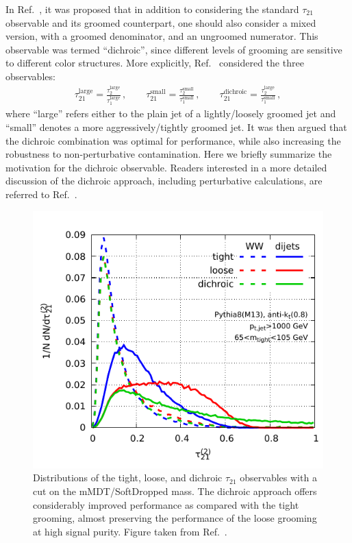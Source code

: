 \documentclass[11pt]{cernrep}
\begin{document}
In Ref.~\cite{Salam:2016yht}, it was proposed that in addition to considering the standard $\tau_{21}$ observable and its groomed counterpart, one should also consider a mixed version, with a groomed denominator, and an ungroomed numerator.
%
This observable was termed ``dichroic'', since different levels of grooming are sensitive to different color structures.
%
More explicitly, Ref.~\cite{Salam:2016yht} considered the three observables:
%
\begin{align}
  \tau_{21}^{\text{large}} =\frac{\tau_2^{\text{large}}}{\tau_1^{\text{large}}}\,,
  \qquad
  \tau_{21}^{\text{small}} =\frac{\tau_2^{\text{small}}}{\tau_1^{\text{small}}}\,,
  \qquad
  \tau_{21}^{\text{dichroic}} =\frac{\tau_2^{\text{large}}}{\tau_1^{\text{small}}}\,,
\end{align}
where ``large'' refers either to the plain jet of a
lightly/loosely groomed jet and ``small'' denotes a more aggressively/tightly
groomed jet.
%
It was then argued that the dichroic combination was optimal for
performance, while also increasing the robustness to non-perturbative
contamination.
%
Here we briefly summarize the motivation for the dichroic observable.
%
Readers interested in a more detailed discussion of the dichroic approach, including perturbative calculations, are referred to Ref.~\cite{Salam:2016yht}.

\begin{figure}[t]
\begin{center}
\includegraphics[width=0.5\columnwidth]{jetsub_2prong_dichroic-illust}
\end{center}
\caption{Distributions of the tight, loose, and dichroic $\tau_{21}$ observables with a cut on the mMDT/SoftDropped mass. The dichroic approach offers considerably improved performance as compared with the tight grooming, almost preserving the performance of the loose grooming at high signal purity.  Figure taken from Ref.~\cite{Salam:2016yht}.}
\label{jetsub_2prong_fig:dichroic_distribution}
\end{figure}
\end{document}
